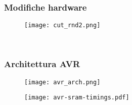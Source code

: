 \documentclass[aspectratio=169,
]{beamer}
\begin{document}
    \begin{frame}
        \frametitle{Modifiche hardware}
        \begin{minipage}{.40\textwidth}
        \begin{figure}
            \texttt{[image: cut\_rnd2.png]}
        \end{figure}
        \end{minipage}
        \begin{minipage}{.44\textwidth}
            \begin{figure}
                \begin{minipage}{.58\textwidth}
                \end{minipage}
                \begin{minipage}{.4\textwidth}
                     \\
                \end{minipage}
            \end{figure}
        \end{minipage}
    
    \end{frame}

    \begin{frame}
        \frametitle{Architettura AVR}
        \begin{minipage}{.5\textwidth}
            \begin{figure}
                \texttt{[image: avr\_arch.png]}
            \end{figure}
        \end{minipage}
        \begin{minipage}{.48\textwidth}
            \begin{figure}
                \texttt{[image: avr-sram-timings.pdf]}
            \end{figure}
        \end{minipage}
    \end{frame}
\end{document}
